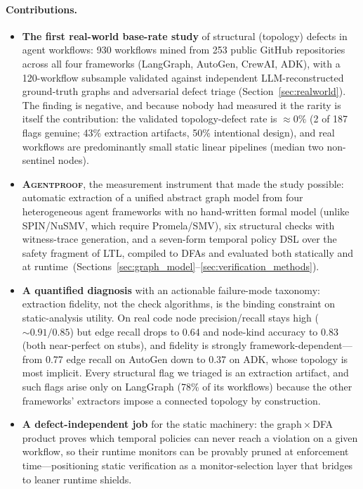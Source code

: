 \paragraph{Contributions.}
\begin{itemize}
  \item \textbf{The first real-world base-rate study} of structural
  (topology) defects in agent workflows: 930 workflows mined from 253
  public GitHub repositories across all four frameworks (LangGraph,
  AutoGen, CrewAI, ADK), with a 120-workflow subsample validated against
  independent LLM-reconstructed ground-truth graphs and adversarial defect
  triage (Section~\ref{sec:realworld}). The finding is negative, and
  because nobody had measured it the rarity is itself the contribution:
  the validated topology-defect rate is ${\approx}0\%$ (2 of 187 flags
  genuine; 43\% extraction artifacts, 50\% intentional design), and real
  workflows are predominantly small static linear pipelines (median two
  non-sentinel nodes).
  \item \textbf{\textsc{Agentproof}}, the measurement instrument that made
  the study possible: automatic extraction of a unified abstract graph
  model from four heterogeneous agent frameworks with no hand-written
  formal model (unlike SPIN/NuSMV, which require Promela/SMV), six
  structural checks with witness-trace generation, and a seven-form
  temporal policy DSL over the safety fragment of LTL, compiled to DFAs
  and evaluated both statically and at
  runtime~(Sections~\ref{sec:graph_model}--\ref{sec:verification_methods}).
  \item \textbf{A quantified diagnosis} with an actionable failure-mode
  taxonomy: extraction fidelity, not the check algorithms, is the binding
  constraint on static-analysis utility. On real code node
  precision/recall stays high (${\sim}0.91/0.85$) but edge recall drops
  to 0.64 and node-kind accuracy to 0.83 (both near-perfect on stubs),
  and fidelity is strongly framework-dependent---from 0.77 edge recall on
  AutoGen down to 0.37 on ADK, whose topology is most implicit. Every
  structural flag we triaged is an extraction artifact, and such flags
  arise only on LangGraph (78\% of its workflows) because the other
  frameworks' extractors impose a connected topology by construction.
  \item \textbf{A defect-independent job} for the static machinery: the
  graph\,$\times$\,DFA product proves which temporal policies can never
  reach a violation on a given workflow, so their runtime monitors can be
  provably pruned at enforcement time---positioning static verification
  as a monitor-selection layer that bridges to leaner runtime shields.
\end{itemize}

